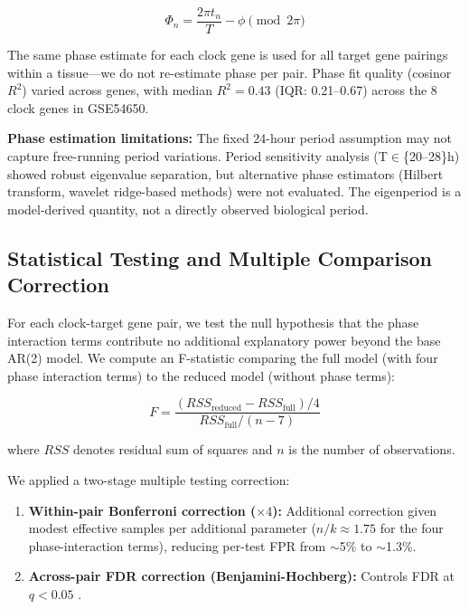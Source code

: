 \documentclass[11pt,a4paper]{article}
\begin{document}
\begin{equation}
\Phi_n = \frac{2\pi t_n}{T} - \phi \pmod{2\pi}
\end{equation}

The same phase estimate for each clock gene is used for all target gene pairings within a tissue---we do not re-estimate phase per pair. Phase fit quality (cosinor $R^2$) varied across genes, with median $R^2 = 0.43$ (IQR: 0.21--0.67) across the 8 clock genes in GSE54650.

\textbf{Phase estimation limitations:} The fixed 24-hour period assumption may not capture free-running period variations. Period sensitivity analysis (T$\in$\{20--28\}h) showed robust eigenvalue separation, but alternative phase estimators (Hilbert transform, wavelet ridge-based methods) were not evaluated. The eigenperiod is a model-derived quantity, not a directly observed biological period.

\subsection{Statistical Testing and Multiple Comparison Correction}

For each clock-target gene pair, we test the null hypothesis that the phase interaction terms contribute no additional explanatory power beyond the base AR(2) model. We compute an F-statistic comparing the full model (with four phase interaction terms) to the reduced model (without phase terms):

\begin{equation}
F = \frac{(RSS_{\text{reduced}} - RSS_{\text{full}}) / 4}{RSS_{\text{full}} / (n - 7)}
\end{equation}

where $RSS$ denotes residual sum of squares and $n$ is the number of observations.

We applied a two-stage multiple testing correction:

\begin{enumerate}[noitemsep]
    \item \textbf{Within-pair Bonferroni correction ($\times 4$):} Additional correction given modest effective samples per additional parameter ($n/k \approx 1.75$ for the four phase-interaction terms), reducing per-test FPR from $\sim$5\% to $\sim$1.3\%.
    \item \textbf{Across-pair FDR correction (Benjamini-Hochberg):} Controls FDR at $q < 0.05$ \citep{benjamini1995}.
\end{enumerate}
\end{document}
